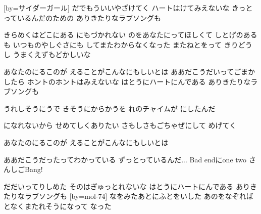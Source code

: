 \documentclass{article}
\newenvironment{Japanese}{%
\CJKfamily{min}%
\CJKtilde
\CJKnospace}{}
\begin{document}
\begin{CJK}{UTF8}{}
\begin{Japanese}
\begin{songs}{}
\endverse
\endsong
[by=サイダーガール]
\beginverse
{}だでもういいやざけてく
ハートはけてみえないな
きっとっているんだのための
ありきたりなラブソングも

きらめくはどこにある
にもづかれない
のをあなたにってほしくて
しとげのあるも
いつものやしぐさにも
してまたわからなくなった
またねとをって
きりどうし
うまくえずもどかしいな

あなたのにるこのが
えることがこんなにもしいとは
ああだこうだいってごまかしたら
ホントのホントはみえないな
はとうにハートにんである
ありきたりなラブソングも

うれしそうにうで
きそうにからかうを
れのチャイムが
にしたんだ

になれないから
せめてしくありたい
さもしさもごちゃぜにして
めげてく

あなたのにるこのが
えることがこんなにもしいとは

ああだこうだったってわかっている
ずっとっているんだ...
Bad endにone two さんしごBang!

だだいってりしめた
そのはぎゅっとれないな
はとうにハートにんである
ありきたりなラブソングも
\endverse
\endsong
[by=mol-74]
\beginverse
{}なをみたあとにふとをいした
あのをなぞればとなくまたれそうになって
なった


\end{songs}
\end{Japanese}
\end{CJK}
\end{document}
